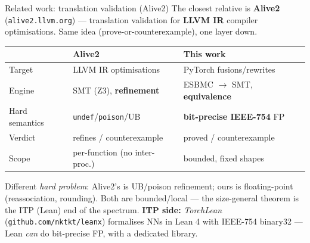 \documentclass[aspectratio=169,11pt]{beamer}
\begin{document}
\begin{frame}{Related work: translation validation (Alive2)}
  The closest relative is \textbf{Alive2} (\texttt{alive2.llvm.org}) --- translation validation
  for \textbf{LLVM IR} compiler optimisations. Same idea (prove-or-counterexample), one layer down.

  \medskip
  \begin{tabular}{@{}p{} p{} p{}@{}}
    \toprule
    & \textbf{Alive2} & \textbf{This work} \\
    \midrule
    Target & LLVM IR optimisations & PyTorch fusions/rewrites \\
    Engine & SMT (Z3), \textbf{refinement} & ESBMC $\to$ SMT, \textbf{equivalence} \\
    Hard semantics & \texttt{undef}/\texttt{poison}/UB & \textbf{bit-precise IEEE-754} FP \\
    Verdict & refines / counterexample & proved / counterexample \\
    Scope & per-function (no inter-proc.) & bounded, fixed shapes \\
    \bottomrule
  \end{tabular}

  \medskip
  {\footnotesize Different \emph{hard problem}: Alive2's is UB/poison refinement; ours is
  floating-point (reassociation, rounding). Both are bounded/local --- the size-general theorem is
  the ITP (Lean) end of the spectrum. \textbf{ITP side:} \emph{TorchLean}
  (\texttt{github.com/nktkt/leanx}) formalises NNs in Lean 4 with IEEE-754 binary32 --- Lean
  \emph{can} do bit-precise FP, with a dedicated library.}
\end{frame}
\end{document}
